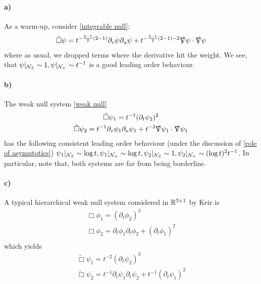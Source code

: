 \documentclass[11pt, oneside]{amsart}
\begin{document}
	\paragraph{a)}As a warm-up, consider \eqref{integrable null}:
	\begin{equation*}
		\begin{gathered}
			\tilde{\Box}\psi=t^{-\frac{3-1}{2}(2-1)}\partial_v\psi\partial_u\psi+t^{-\frac{3-1}{2}(2-1)-2}\slashed{\nabla}\psi\cdot\slashed{\nabla}\psi
		\end{gathered}
	\end{equation*}
	where as usual, we dropped terms where the derivative hit the weight. We see, that $\psi|_{\mathcal{N}_{\mathcal{I}}}\sim 1,\psi|_{\mathcal{N}_+}\sim t^{-1}$ is a good leading order behaviour. 
	
	\paragraph{b)} The weak null system \eqref{weak null}
	\begin{equation*}
		\begin{gathered}
			\tilde{\Box}\psi_1=t^{-1}(\partial_t\psi_2)^2\\
			\tilde{\Box}\psi_2=t^{-1}\partial_v\psi_1\partial_u\psi_1+t^{-3}\slashed{\nabla}\psi_1\cdot\slashed{\nabla}\psi_1
		\end{gathered}
	\end{equation*}
	has the following consistent leading order behaviour (under the discussion of \cref{role of asymptotics})	$\psi_1|_{\mathcal{N}_{\mathcal{I}}}\sim \log t,\psi_1|_{\mathcal{N}_+}\sim \log t,\psi_2|_{\mathcal{N}_{\mathcal{I}}}\sim1,\psi_2|_{\mathcal{N}_+}\sim (\log t)^2t^{-1}$. In particular, note that, both systems are far from being borderline.
	
	\paragraph{c)}
	A typical hierarchical weak null system considered in $\mathbb{R}^{3+1}$ by Keir \cite{keir_global_2019} is
	\begin{equation*}
		\begin{gathered}
			\Box\phi_1=(\partial_t\phi_2)^3\\
			\Box\phi_2=\partial_t\phi_1\partial_t\phi_2+(\partial_t\phi_1)^2\\
		\end{gathered}
	\end{equation*}
	which yields
	\begin{equation*}
		\begin{gathered}
		\tilde{\Box}\psi_1=t^{-2}(\partial_t\psi_2)^3\\
		\tilde{\Box}\psi_2=t^{-1}\partial_t\psi_1\partial_t\psi_2+t^{-1}(\partial_t\psi_1)^2
		\end{gathered}
	\end{equation*}
\end{document}
